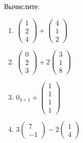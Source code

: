 \documentclass[11pt, a4paper]{extarticle}
\begin{document}
\subsection{}
Вычислите:
\begin{multicols}{2}
		\begin{enumerate}[label=\alph*)]
		\item $\begin{pmatrix}
		1 \\ 2 \\ 4
		\end{pmatrix} + \begin{pmatrix}
		4 \\ 1 \\ 2
		\end{pmatrix}$
		
		\item $\begin{pmatrix}
		0 \\ 2 \\ 3
		\end{pmatrix} + 2\begin{pmatrix}
		3 \\ 1 \\ 8
		\end{pmatrix}$
		
		\item $ 0_{4 \times 1} + \begin{pmatrix}
		1 \\ 1  \\ 1 \\ 1
		\end{pmatrix}$
		
		\item $3\begin{pmatrix}
		7 \\ -1
		\end{pmatrix} - 2 \begin{pmatrix}
		1 \\ 4
		\end{pmatrix}$
	\end{enumerate}
\end{multicols}
\end{document}
